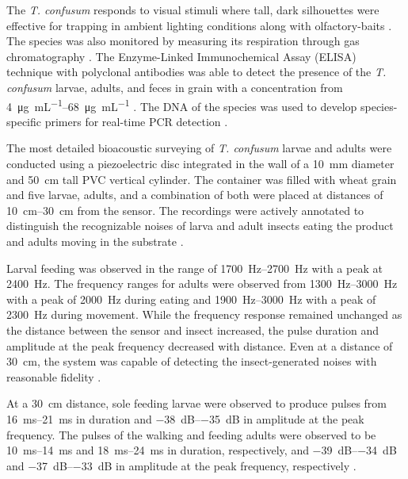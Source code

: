 \documentclass[../Vibro-Acoustic Signatures and Detection Algorithms for Stored Product Insects.tex]{subfiles}
\begin{document}
The \textit{T. confusum} responds to visual stimuli where tall, dark silhouettes were effective for trapping in ambient lighting conditions along with olfactory-baits \cite{semeaoResponseTriboliumCastaneum2011}. The species was also monitored by measuring its respiration through gas chromatography \cite{carlsonRespirationMeasurementTribolium1966}. The Enzyme-Linked Immunochemical Assay (ELISA) technique with polyclonal antibodies was able to detect the presence of the \textit{T. confusum} larvae, adults, and feces in grain with a concentration from \SIrange{4}{68}{\micro\gram\per\milli\liter} \cite{krizkova-kudlikovaDevelopmentPolyclonalAntibodies2008}. The DNA of the species was used to develop species-specific primers for real-time PCR detection \cite{nowaczykMolecularTechniquesDetection2009}.

The most detailed bioacoustic surveying of \textit{T. confusum} larvae and adults were conducted using a piezoelectric disc integrated in the wall of a \SI{10}{\milli\meter} diameter and \SI{50}{\centi\meter} tall PVC vertical cylinder. The container was filled with wheat grain and five larvae, adults, and a combination of both were placed at distances of \SIrange{10}{30}{\centi\meter} from the sensor. The recordings were actively annotated to distinguish the recognizable noises of larva and adult insects eating the product and adults moving in the substrate \cite{mousaviAcousticDetectionPossibility2017}. 

Larval feeding was observed in the range of \SIrange{1700}{2700}{\hertz} with a peak at \SI{2400}{\hertz}. The frequency ranges for adults were observed from \SIrange{1300}{3000}{\hertz} with a peak of \SI{2000}{\hertz} during eating and \SIrange{1900}{3000}{\hertz} with a peak of \SI{2300}{\hertz} during movement. While the frequency response remained unchanged as the distance between the sensor and insect increased, the pulse duration and amplitude at the peak frequency decreased with distance. Even at a distance of \SI{30}{\centi\meter}, the system was capable of detecting the insect-generated noises with reasonable fidelity \cite{mousaviAcousticDetectionPossibility2017}.

At a \SI{30}{\centi\meter} distance, sole feeding larvae were observed to produce pulses from \SIrange{16}{21}{\milli\second} in duration and \SIrange{-38}{-35}{\deci\bel} in amplitude at the peak frequency. The pulses of the walking and feeding adults were observed to be \SIrange{10}{14}{\milli\second} and \SIrange{18}{24}{\milli\second} in duration, respectively, and \SIrange{-39}{-34}{\deci\bel} and \SIrange{-37}{-33}{\deci\bel} in amplitude at the peak frequency, respectively \cite{mousaviAcousticDetectionPossibility2017}.
\end{document}
